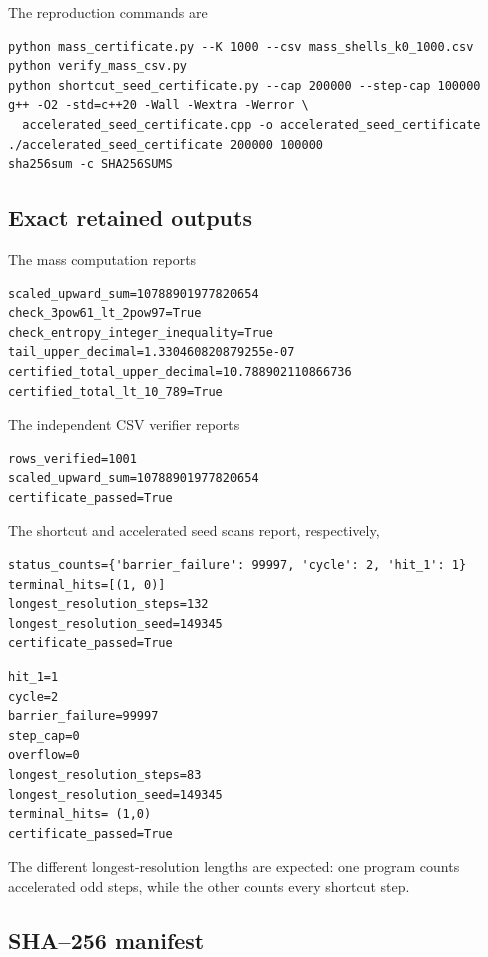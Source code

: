 \documentclass[11pt]{article}
\theoremstyle{definition}
\theoremstyle{remark}
\begin{document}
The reproduction commands are
\begin{Verbatim}[fontsize=\small,frame=single]
python mass_certificate.py --K 1000 --csv mass_shells_k0_1000.csv
python verify_mass_csv.py
python shortcut_seed_certificate.py --cap 200000 --step-cap 100000
g++ -O2 -std=c++20 -Wall -Wextra -Werror \
  accelerated_seed_certificate.cpp -o accelerated_seed_certificate
./accelerated_seed_certificate 200000 100000
sha256sum -c SHA256SUMS
\end{Verbatim}

\subsection{Exact retained outputs}

The mass computation reports
\begin{Verbatim}[fontsize=\small,frame=single]
scaled_upward_sum=10788901977820654
check_3pow61_lt_2pow97=True
check_entropy_integer_inequality=True
tail_upper_decimal=1.330460820879255e-07
certified_total_upper_decimal=10.788902110866736
certified_total_lt_10_789=True
\end{Verbatim}
The independent CSV verifier reports
\begin{Verbatim}[fontsize=\small,frame=single]
rows_verified=1001
scaled_upward_sum=10788901977820654
certificate_passed=True
\end{Verbatim}
The shortcut and accelerated seed scans report, respectively,
\begin{Verbatim}[fontsize=\small,frame=single]
status_counts={'barrier_failure': 99997, 'cycle': 2, 'hit_1': 1}
terminal_hits=[(1, 0)]
longest_resolution_steps=132
longest_resolution_seed=149345
certificate_passed=True
\end{Verbatim}
\begin{Verbatim}[fontsize=\small,frame=single]
hit_1=1
cycle=2
barrier_failure=99997
step_cap=0
overflow=0
longest_resolution_steps=83
longest_resolution_seed=149345
terminal_hits= (1,0)
certificate_passed=True
\end{Verbatim}
The different longest-resolution lengths are expected: one program counts
accelerated odd steps, while the other counts every shortcut step.

\subsection{SHA--256 manifest}
\end{document}
